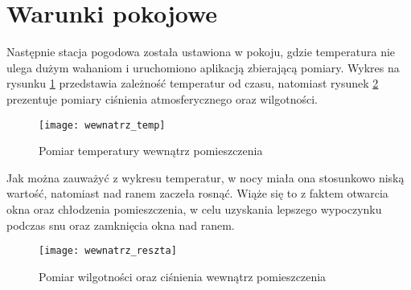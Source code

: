 \section{Warunki pokojowe}
Następnie stacja pogodowa została ustawiona w pokoju, gdzie temperatura nie ulega dużym wahaniom i uruchomiono aplikacją zbierającą pomiary. Wykres na rysunku \ref{fig:wewnatrz_temp} przedstawia zależność temperatur od czasu, natomiast rysunek \ref{fig:wewnatrz_reszta} prezentuje pomiary ciśnienia atmosferycznego oraz wilgotności.
\begin{figure}[h]
\centering
\texttt{[image: wewnatrz\_temp]}
\caption{Pomiar temperatury wewnątrz pomieszczenia}
\label{fig:wewnatrz_temp}
\end{figure}
Jak można zauważyć z wykresu temperatur, w nocy miała ona stosunkowo niską wartość, natomiast nad ranem zaczeła rosnąć. Wiąże się to z faktem otwarcia okna oraz chłodzenia pomieszczenia, w celu uzyskania lepszego wypoczynku podczas snu oraz zamknięcia okna nad ranem.

\begin{figure}[h]
\centering
\texttt{[image: wewnatrz\_reszta]}
\caption{Pomiar wilgotności oraz ciśnienia wewnątrz pomieszczenia}
\label{fig:wewnatrz_reszta}
\end{figure}